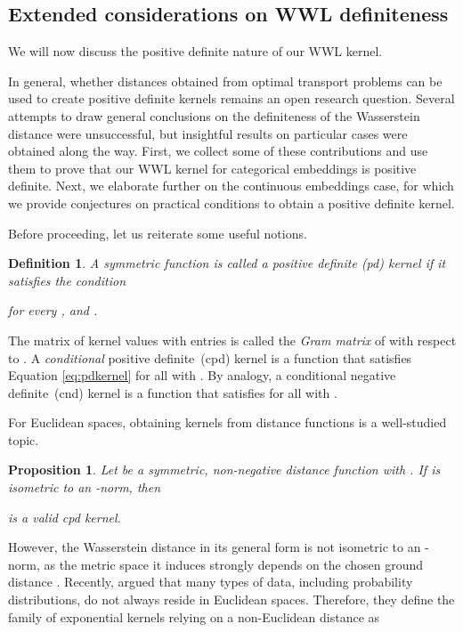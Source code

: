 \documentclass{article}
\newtheorem{definition}{Definition}
\newtheorem{proposition}{Proposition}
\begin{document}
\subsection{Extended considerations on WWL definiteness}
\label{app:definiteness}

We will now discuss the positive definite nature of our WWL kernel. 

In general, whether distances obtained from optimal transport problems can be used to create positive definite kernels remains an open research question. Several attempts to draw general conclusions on the definiteness of the Wasserstein distance were unsuccessful, but insightful results on particular cases were obtained along the way. 
First, we collect some of these contributions and use them to prove that our WWL kernel for categorical embeddings is positive definite. 
Next, we elaborate further on the continuous embeddings case, for which we provide conjectures on practical conditions to obtain a positive definite kernel.

Before proceeding, let us reiterate some useful notions.
\begin{definition} \cite{scholkopf2002learning}
A symmetric function  is called a \textup{positive definite (pd) kernel} if it satisfies the condition

for every ,  and .
\end{definition}

The matrix of kernel values  with entries  is called the \emph{Gram matrix} of  with respect to . A \textit{conditional} positive definite~(cpd) kernel is a function that satisfies Equation \ref{eq:pdkernel} for all  with . 
By analogy, a conditional negative definite~(cnd) kernel is a function that satisfies  for all  with .

For Euclidean spaces, obtaining kernels from distance functions is a well-studied topic.

\begin{proposition}
\citep{haasdonk2004learning}
\label{prop:haasdonk}
Let  be a symmetric, non-negative distance function with . If  is isometric to an -norm, then 

is a valid cpd kernel.
\end{proposition}


However, the Wasserstein distance in its general form is not isometric to an -norm, as the metric space it induces strongly depends on the chosen ground distance \citep{figalli2011optimal}.
Recently, \citet{feragen2015geodesic} argued that many types of data, including probability distributions, do not always reside in Euclidean spaces. Therefore, they define the family of exponential kernels relying on a non-Euclidean distance  as 
\end{document}
